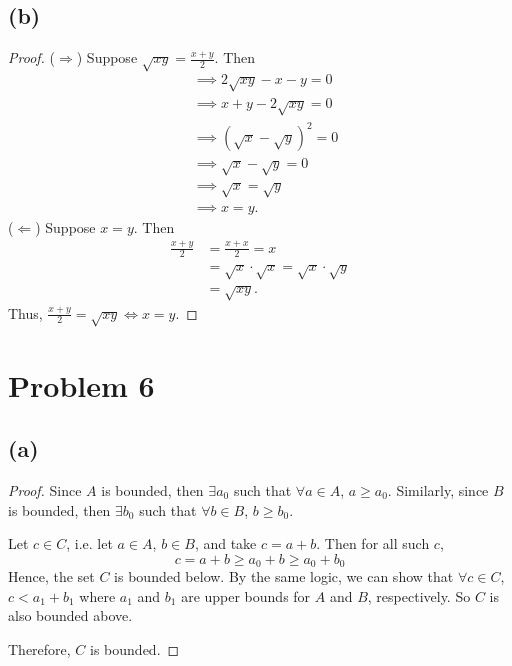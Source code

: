 \documentclass{article}
\begin{document}
\subsection*{(b)}
\begin{proof}
	($\Rightarrow$) Suppose $\sqrt{xy} = \frac{x+y}{2}$. Then
	\begin{align}
		&\implies 2\sqrt{xy} - x - y = 0 \\
		&\implies x + y - 2\sqrt{xy} = 0 \\
		&\implies \left(\sqrt{x} - \sqrt{y}\right)^2 = 0 \\
		&\implies \sqrt{x} - \sqrt{y} = 0 \\
		&\implies \sqrt{x} = \sqrt{y} \\
		&\implies x = y.
	\end{align}
	($\Leftarrow$) Suppose $x=y$. Then
	\begin{align}
		\frac{x+y}{2} &= \frac{x+x}{2} = x \\
		&= \sqrt{x}\cdot \sqrt{x} = \sqrt{x}\cdot \sqrt{y}\\
		&= \sqrt{xy}.
	\end{align}
	Thus, $\frac{x+y}{2}=\sqrt{xy} \iff x=y$.
\end{proof}

\section*{Problem 6}
\subsection*{(a)}
\begin{proof}
	Since $A$ is bounded, then $\exists a_0$ such that $\forall a \in A$, $a \geq a_0$. Similarly, since $B$ is bounded, then $\exists b_0$ such that $\forall b \in B$, $b \geq b_0$. 
	
	Let $c\in C$, i.e. let $a\in A$, $b\in B$, and take $c = a + b$. Then for all such $c$, 
	\begin{equation}
		c = a + b \geq a_0 + b \geq a_0 + b_0
	\end{equation}
	Hence, the set $C$ is bounded below. By the same logic, we can show that $\forall c\in C$, $c<a_1 + b_1$ where $a_1$ and $b_1$ are upper bounds for $A$ and $B$, respectively. So $C$ is also bounded above.
	
	Therefore, $C$ is bounded.
\end{proof}
\end{document}
